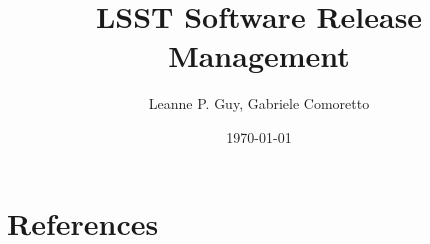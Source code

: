 \documentclass[DM,lsstdraft,toc]{lsstdoc}
\title{LSST Software Release Management}
\author{%
Leanne P. Guy, Gabriele Comoretto
}
\date{\today}
\begin{document}
\maketitle



\newpage


\newpage


\appendix



\section{References} \label{sec:bib}


\printglossaries
\end{document}
